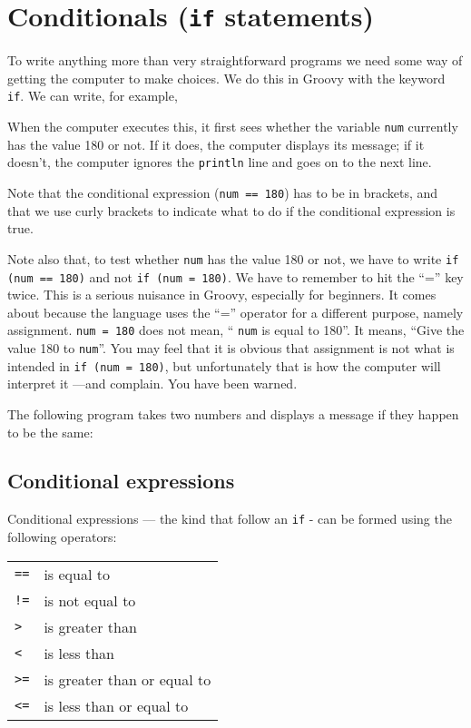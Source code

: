 \section{Conditionals (\texttt{if} statements)}

To write anything more than very straightforward programs we need some way
of getting the computer to make choices.
We do this in Groovy with the keyword \verb!if!.
We can write, for example,


When the computer executes this, it first sees whether the variable \verb!num!
currently has the value 180 or not.  If it does, the computer displays
its message; if it doesn't, the computer ignores the  \verb!println! line
and goes on to the next line.

Note that the conditional expression (\verb!num == 180!) has to be
in brackets, and that we use curly brackets to indicate what to do if
the conditional expression is true. 

Note also that, to test whether  \verb!num! has the value 180
or not, we have to write \verb!if (num == 180)! and not \verb!if (num = 180)!.
We have to remember to hit the ``='' key twice.
This is a serious nuisance in Groovy, especially for beginners.
It comes about because the language uses the ``='' operator for a different
purpose, namely assignment.  \verb!num = 180! does not mean, `` \verb!num! is
equal to 180''.  It means, ``Give the value 180 to  \verb!num!''.  You may feel
that it is obvious that assignment is not what is intended in
\verb!if (num = 180)!, but unfortunately that is
how the computer will interpret it ---and complain.
You have been warned.

The following program takes two numbers and displays a message if they happen
to be the same:


\subsection{Conditional expressions}
\label{sec:cond-expr}

Conditional expressions --- the kind that follow an \verb!if! -
can be formed using the following operators:

\begin{tabular}{ll}
\verb+==+ &is equal to\\
\verb+!=+ &is not equal to\\
\verb+>+ &is greater than\\
\verb+<+ &is less than\\
\verb+>=+ & is greater than or equal to\\
\verb+<=+ &is less than or equal to\\
\end{tabular}

